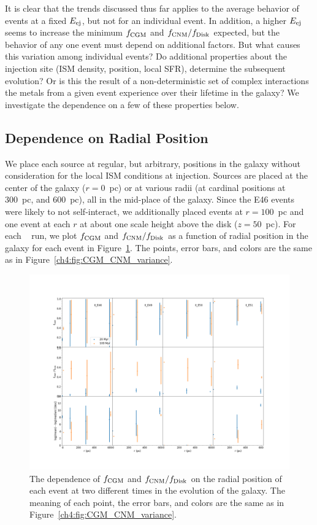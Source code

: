It is clear that the trends discussed thus far applies to the average behavior of events at a fixed $E_{\rm ej}$, but not for an individual event. In addition, a higher $E_{\rm ej}$ seems to increase the minimum $f_{\rm CGM}$ and $f_{\rm CNM} / f_{\rm Disk}$ expected, but the behavior of any one event must depend on additional factors. But what causes this variation among individual events? Do additional properties about the injection site (ISM density, position, local SFR), determine the subsequent evolution? Or is this the result of a non-deterministic set of complex interactions the metals from a given event experience over their lifetime in the galaxy? We investigate the dependence on a few of these properties below.

\subsection{Dependence on Radial Position}
\label{ch4:sec:radial position}
We place each source at regular, but arbitrary, positions in the galaxy without consideration for the local ISM conditions at injection. Sources are placed at the center of the galaxy ($r = 0$~pc) or at various radii (at cardinal positions at 300~pc, and 600~pc), all in the mid-place of the galaxy. Since the E46 events were likely to not self-interact, we additionally placed events at $r = 100$~pc and one event at each $r$ at about one scale height above the disk ($z = 50$~pc). For each \runonenu~ run, we plot $f_{\rm CGM}$ and $f_{\rm CNM} / f_{\rm Disk}$ as a function of radial position in the galaxy for each event in Figure~\ref{ch4:fig:radial position}. The points, error bars, and colors are the same as in Figure~\ref{ch4:fig:CGM_CNM_variance}.

 \begin{figure}
   \centering
   \includegraphics[angle=90,width=0.99\linewidth]{figures/ch4/II_radial_dependence}
   \caption{The dependence of $f_{\rm CGM}$ and $f_{\rm CNM} / f_{\rm Disk}$ on the radial position of each event at two different times in the evolution of the galaxy. The meaning of each point, the error bars, and colors are the same as in Figure~\ref{ch4:fig:CGM_CNM_variance}.}
   \label{ch4:fig:radial position}
 \end{figure}

